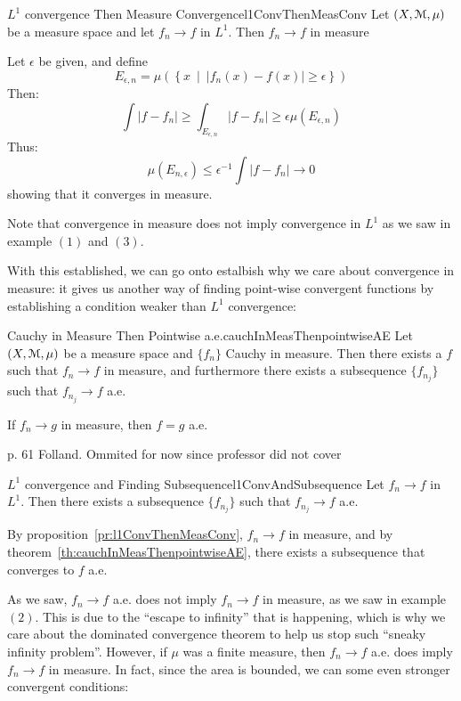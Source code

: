 \documentclass[oneside]{book}
\newcommand{\EM}{\EuScript{M}}
\newcommand{\set}[2]{\left\{#1 \ \middle|\ #2\right\}}
\newcommand{\rw}{\rightarrow}
\begin{document}
\begin{prop}{$L^1$ convergence Then Measure Convergence}{l1ConvThenMeasConv}
	Let $(X, \EM, \mu)$ be a measure space and let $f_n \rw f$ in $L^1$. Then $f_n \rw f$ in measure
\end{prop}

\begin{Proof}
	Let $\epsilon$ be given, and define
	\[
		E_{\epsilon, n} = \mu(\set{x}{|f_n(x)-f(x)| \ge \epsilon})
	\]
	Then:
	\[
		\int |f -f_n| \ge \int_{E_{\epsilon, n}} |f-f_n| \ge \epsilon \mu(E_{\epsilon, n})
	\]
	Thus:
	\[
		\mu(E_{n, \epsilon}) \le \epsilon^{-1}\int |f-f_n| \rw 0
	\]
	showing that it converges in measure. 
\end{Proof}

Note that convergence in measure does not imply convergence in $L^1$ as we saw in example $(1)$ and $(3)$. 

With this established, we can go onto estalbish why we care about convergence in measure: it gives us another way of
finding point-wise convergent functions by establishing a condition weaker than $L^1$ convergence:

\begin{thm}{Cauchy in Measure Then Pointwise a.e.}{cauchInMeasThenpointwiseAE}
	Let $(X, \EM, \mu)$ be a measure space and $\{f_n\}$ Cauchy in measure. Then there exists a $f$ such that $f_n \rw
	f$ in measure, and furthermore there exists a subsequence $\{f_{n_j}\}$ such that $f_{n_j} \rw f$ a.e.

	If $f_n \rw g$ in measure, then $f = g$ a.e.
\end{thm}

\begin{Proof}
	p. 61 Folland. Ommited for now since professor did not cover
\end{Proof}

\begin{cor}{$L^1$ convergence and Finding Subsequence}{l1ConvAndSubsequence}
	Let $f_n \rw f$ in $L^1$. Then there exists a subsequence $\{f_{n_j}\}$ such that $f_{n_j} \rw f$ a.e.
\end{cor}

\begin{Proof}
	By proposition~\ref{pr:l1ConvThenMeasConv}, $f_n \rw f$ in measure, and by
	theorem~\ref{th:cauchInMeasThenpointwiseAE}, there exists a subsequence that converges to $f$ a.e.
\end{Proof}

As we saw, $f_n \rw f$ a.e. does not imply $f_n \rw f$ in measure, as we saw in example $(2)$. This is due to the
``escape to infinity'' that is happening, which is why we care about the dominated convergence theorem to help us stop
such ``sneaky infinity problem''. However, if $\mu$ was a finite measure, then $f_n \rw f$ a.e. does imply $f_n \rw f$
in measure. In fact, since the area is bounded, we can some even stronger convergent conditions:
\end{document}
